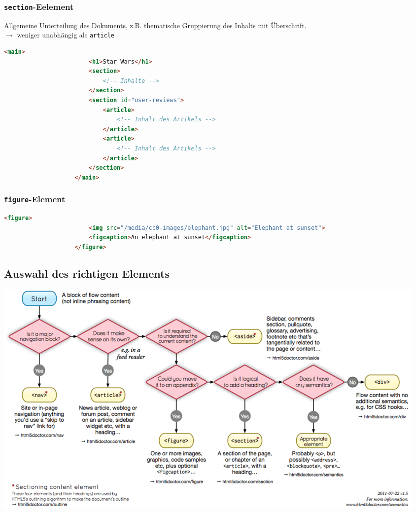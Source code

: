 \documentclass[a4paper, landscape, 8pt]{scrartcl}
\begin{document}
\begin{multicols*}{4}
        \subsubsection{\texttt{section}-Eelement}
        Allgemeine Unterteilung des Dokuments, z.B. thematische Gruppierung des Inhalts mit Überschrift. \\
        $\to$ weniger unabhängig als \texttt{article} \\
        \begin{lstlisting}[language=HTML]
                    <main>
                        <h1>Star Wars</h1>
                        <section>
                            <!-- Inhalte -->
                        </section>
                        <section id="user-reviews">
                            <article>
                                <!-- Inhalt des Artikels -->
                            </article>
                            <article>
                                <!-- Inhalt des Artikels -->
                            </article>
                        </section>
                    </main>
        \end{lstlisting}
        \subsubsection{\texttt{figure}-Element}
        \begin{lstlisting}[language=HTML]
                    <figure>
                        <img src="/media/cc0-images/elephant.jpg" alt="Elephant at sunset">
                        <figcaption>An elephant at sunset</figcaption>
                    </figure>
        \end{lstlisting}

        \subsection{Auswahl des richtigen Elements}
        \includegraphics[width=\columnwidth]{graphic/27-auswahl-element}


\end{multicols*}
\end{document}
